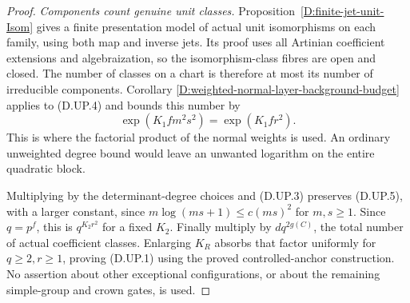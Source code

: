 \begin{proof}
\emph{Components count genuine unit classes.}
Proposition~\ref{D:finite-jet-unit-Isom} gives a finite
presentation model of actual unit isomorphisms on each
family, using both map and inverse jets. Its proof uses
all Artinian coefficient extensions and algebraization,
so the isomorphism-class fibres are open and closed.
The number of classes on a chart is therefore at most its
number of irreducible components. Corollary
\ref{D:weighted-normal-layer-background-budget} applies
to (D.UP.4) and bounds this number by
\[
                            \exp(K_1 f m^2s^2)
                                  =\exp(K_1 f r^2).     \tag{D.UP.5}
\]
This is where the factorial product of the normal weights
is used. An ordinary unweighted degree bound would leave
an unwanted logarithm on the entire quadratic block.

Multiplying by the determinant-degree choices and (D.UP.3)
preserves (D.UP.5), with a larger constant, since
$m\log(ms+1)\leq c(ms)^2$ for $m,s\geq1$.
Since $q=p^f$, this is $q^{K_2r^2}$ for a fixed $K_2$.
Finally multiply by $d q^{2g(C)}$, the total number of
actual coefficient classes. Enlarging $K_R$ absorbs that
factor uniformly for $q\geq2,r\geq1$, proving (D.UP.1)
using the proved controlled-anchor construction.
No assertion about other exceptional configurations, or
about the remaining simple-group and crown gates, is used.
\end{proof}
